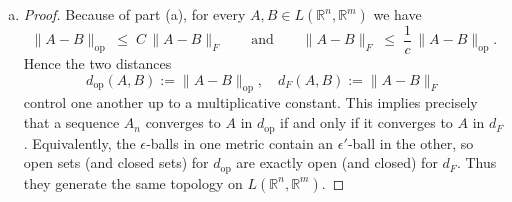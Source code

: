 \documentclass[11pt]{article}
\begin{document}
\begin{exercise}{6}
\begin{enumerate} [(a)]
\begin{proof}
Combining the two inequalities,
\[
  \|A\|_{F}
    \;\le\;\sqrt{n}\,\|A\|_{\mathrm{op}}
  \quad\text{and}\quad
  \|A\|_{F}
    \;\le\;\sqrt{m}\,\|A\|_{\mathrm{op}}
\]
immediately implies
\[
  \|A\|_{F}
    \;\le\;\sqrt{\min(m,n)}\;\|A\|_{\mathrm{op}}.
\]
Setting $c = 1/\sqrt{\min(m,n)}$ and $C=1$ yields the required two‐sided bound.
        \end{proof}
        \item \begin{proof}
            Because of part (a), for every $A,B\in L(\mathbb{R}^n,\mathbb{R}^m)$ we have
\[
  \|A-B\|_{\mathrm{op}}
    \;\le\;
  C\,\|A-B\|_F
  \qquad\text{and}\qquad
  \|A-B\|_F
    \;\le\;
  \frac{1}{c}\,\|A-B\|_{\mathrm{op}}.
\]
Hence the two distances 
\[
  d_{\mathrm{op}}(A,B):=\|A-B\|_{\mathrm{op}},
  \quad
  d_F(A,B):=\|A-B\|_F
\]
control one another up to a multiplicative constant.  This implies precisely that a sequence $A_n$ converges to $A$ in $d_{\mathrm{op}}$ if and only if it converges to $A$ in $d_F$.  
Equivalently, the $\epsilon$‐balls in one metric contain an $\epsilon'$‐ball in the other, so open sets (and closed sets) for $d_{\mathrm{op}}$ are exactly open (and closed) for $d_F$.  
Thus they generate the same topology on $L(\mathbb{R}^n,\mathbb{R}^m)$.
        \end{proof}
    \end{enumerate}
\end{exercise}
\end{document}
